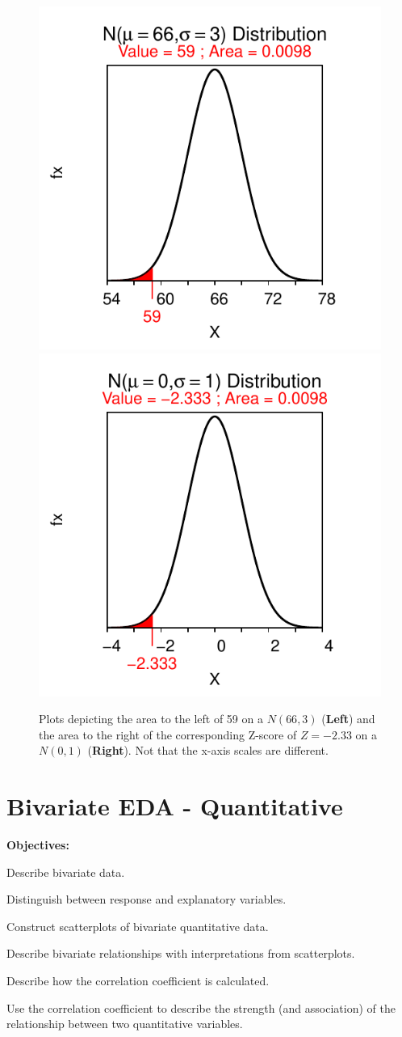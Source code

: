 \documentclass[10pt,openany]{book}\usepackage[]{graphicx}\usepackage[]{color}
\newenvironment{knitrout}{}{} %
\begin{document}
\begin{knitrout}
\color{fgcolor}\begin{figure}[hbtp]

{\centering \includegraphics[width=.4\linewidth]{Figs/NormStandardizingEx-1} 
\includegraphics[width=.4\linewidth]{Figs/NormStandardizingEx-2} 

}

\caption{Plots depicting the area to the left of 59 on a $N(66,3)$ (\textbf{Left}) and the area to the right of the corresponding Z-score of $Z=-2.33$ on a $N(0,1)$ (\textbf{Right}).  Not that the x-axis scales are different.}\label{fig:NormStandardizingEx}
\end{figure}


\end{knitrout}



\chapter{Bivariate EDA - Quantitative} \label{chap:BivEDAQuant}
\begin{ChapObj}{\boxwidth}
  \textbf{Objectives:}
  \begin{Enumerate}
    \item Describe bivariate data.
    \item Distinguish between response and explanatory variables.
    \item Construct scatterplots of bivariate quantitative data.
    \item Describe bivariate relationships with interpretations from scatterplots.
    \item Describe how the correlation coefficient is calculated.
    \item Use the correlation coefficient to describe the strength (and association) of the relationship between two quantitative variables.
  \end{Enumerate}
\end{ChapObj}
\end{document}
